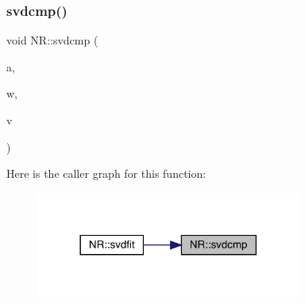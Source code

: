\subsubsection{\texorpdfstring{svdcmp()}{svdcmp()}}
{\footnotesize\ttfamily void N\+R\+::svdcmp (\begin{DoxyParamCaption}\item[{\mbox{\hyperlink{namespaceNR_ad1513aa4697878ed3bff0b8b3c9dd910}{Mat\+\_\+\+I\+O\+\_\+\+DP}} \&}]{a,  }\item[{\mbox{\hyperlink{namespaceNR_a970094d23441f8ef6a45282a7eb2103d}{Vec\+\_\+\+O\+\_\+\+DP}} \&}]{w,  }\item[{\mbox{\hyperlink{namespaceNR_adc1f8da33094b6bbeb1f5f899515ce54}{Mat\+\_\+\+O\+\_\+\+DP}} \&}]{v }\end{DoxyParamCaption})}

Here is the caller graph for this function\+:
\nopagebreak
\begin{figure}[H]
\begin{center}
\leavevmode
\includegraphics[width=246pt]{da/d46/namespaceNR_ad532389e2c426c3c38b860f4fd254103_icgraph}
\end{center}
\end{figure}
\mbox{\label{namespaceNR_afe44878304edad27239234f84f643943}} 
